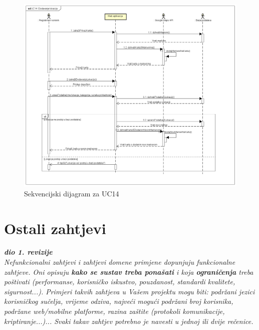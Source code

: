 				\begin{figure}[H]
					\includegraphics[scale=0.4]{slike/SekvencijskiDijagram2.png}
					\centering
					\caption{Sekvencijski dijagram za UC14}
					\label{fig:promjene}
				\end{figure}
				\eject
	
		\section{Ostali zahtjevi}
		
			\textbf{\textit{dio 1. revizije}}\\
		 
			 \textit{Nefunkcionalni zahtjevi i zahtjevi domene primjene dopunjuju funkcionalne zahtjeve. Oni opisuju \textbf{kako se sustav treba ponašati} i koja \textbf{ograničenja} treba poštivati (performanse, korisničko iskustvo, pouzdanost, standardi kvalitete, sigurnost...). Primjeri takvih zahtjeva u Vašem projektu mogu biti: podržani jezici korisničkog sučelja, vrijeme odziva, najveći mogući podržani broj korisnika, podržane web/mobilne platforme, razina zaštite (protokoli komunikacije, kriptiranje...)... Svaki takav zahtjev potrebno je navesti u jednoj ili dvije rečenice.}
			 
			 
			 
	